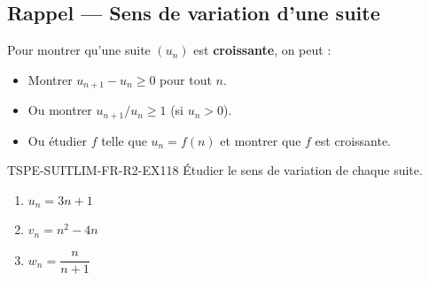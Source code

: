 

\subsection*{Rappel — Sens de variation d'une suite}

Pour montrer qu'une suite $(u_n)$ est \textbf{croissante}, on peut :
\begin{itemize}
  \item Montrer $u_{n+1} - u_n \geq 0$ pour tout $n$.
  \item Ou montrer $u_{n+1}/u_n \geq 1$ (si $u_n > 0$).
  \item Ou étudier $f$ telle que $u_n = f(n)$ et montrer que $f$ est croissante.
\end{itemize}

\begin{exercice}{TSPE-SUITLIM-FR-R2-EX1}{1}{8}
Étudier le sens de variation de chaque suite.
\begin{enumerate}
  \item $u_n = 3n + 1$
  \item $v_n = n^2 - 4n$
  \item $w_n = \dfrac{n}{n+1}$
\end{enumerate}
\end{exercice}

